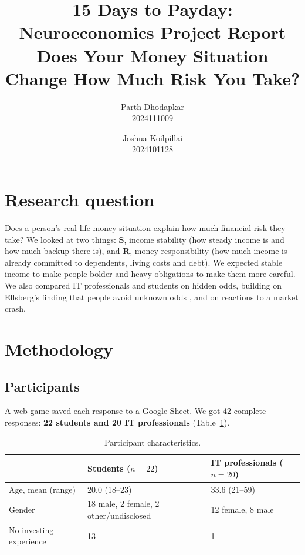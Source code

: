 \documentclass[10pt,a4paper]{article}
\title{\textbf{15 Days to Payday: Neuroeconomics Project Report}\\[2pt]\large Does Your Money Situation Change How Much Risk You Take?}
\author{Parth Dhodapkar\\\small 2024111009 \and Joshua Koilpillai\\\small 2024101128}
\date{}
\begin{document}
\maketitle
\vspace{-2em}

\section{Research question}

Does a person's real-life money situation explain how much financial risk they take? We looked at two things: \textbf{S}, income stability (how steady income is and how much backup there is), and \textbf{R}, money responsibility (how much income is already committed to dependents, living costs and debt). We expected stable income to make people bolder and heavy obligations to make them more careful. We also compared IT professionals and students on hidden odds, building on Ellsberg's finding that people avoid unknown odds \cite{ellsberg}, and on reactions to a market crash.

\section{Methodology}

\subsection{Participants}

A web game saved each response to a Google Sheet. We got 42 complete responses: \textbf{22 students and 20 IT professionals} (Table~\ref{tab:participants}).

\begin{table}[H]
\centering\small
\begin{tabular}{lll}
\toprule
 & Students ($n=22$) & IT professionals ($n=20$) \\
\midrule
Age, mean (range) & 20.0 (18--23) & 33.6 (21--59) \\
Gender & 18 male, 2 female, 2 other/undisclosed & 12 female, 8 male \\
No investing experience & 13 & 1 \\
\bottomrule
\end{tabular}
\caption{Participant characteristics.}
\label{tab:participants}
\end{table}
\end{document}
